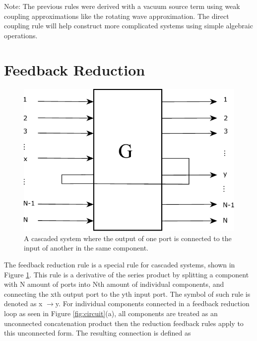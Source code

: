 \documentclass[a4paper]{article}
\begin{document}
Note: The previous rules were derived with a vacuum source term using weak coupling approximations like the rotating wave approximation. The direct coupling rule will help construct more complicated systems using simple algebraic operations.

\section*{Feedback Reduction}

\begin{figure}[H]
\centering
\includegraphics[width = 7.5 cm]{Feedback.pdf}
\caption{A cascaded system where the output of one port is connected to the input of another in the same component.
}
\label{fig:feedback_reduction}
\end{figure}  
The feedback reduction rule is a special rule for cascaded systems, shown in Figure \ref{fig:feedback_reduction}. This rule is a derivative of the series product by splitting a component with N amount of ports into Nth amount of individual components, and connecting the xth output port to the yth input port. The symbol of such rule is denoted as x $ \rightarrow $y. For individual components connected in a feedback reduction loop as seen in Figure \ref{fig:circuit}(a), all components are treated as an unconnected concatenation product then the reduction feedback rules apply to this unconnected form. The resulting connection is defined as 
\end{document}
